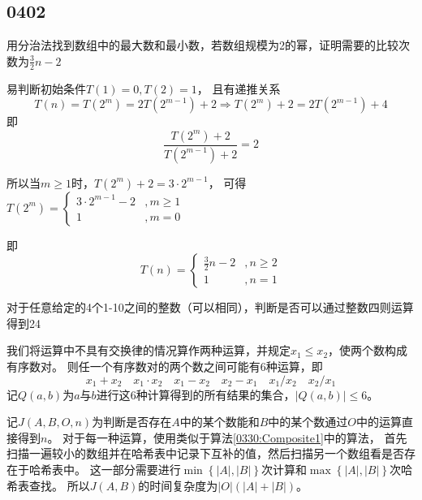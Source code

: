 \begin{questions}
    \section{0402}\label{sec:0402}

    \question 用分治法找到数组中的最大数和最小数，若数组规模为2的幂，证明需要的比较次数为$\frac{3}{2} n -2$
    \begin{solution}
        易判断初始条件$T(1) = 0, T(2) = 1$，
        且有递推关系
        \[ T(n) = T(2^m) = 2T(2^{m-1}) + 2 \Rightarrow T(2^m) + 2 = 2T(2^{m-1}) + 4 \]
        即
        \[ \frac{T(2^m) + 2}{T(2^{m-1}) + 2} = 2 \]

        所以当$m \ge 1$时，$T(2^m) + 2 = 3 \cdot 2^{m-1}$，
        可得$T(2^m) = \begin{cases}
                3 \cdot 2^{m-1} - 2 & , m \ge 1 \\
                1                   & , m = 0
            \end{cases}
        $

        即
        \[
            T(n) = \begin{cases}
                \frac{3}{2} n - 2 & , n \ge 2 \\
                1                 & , n = 1
            \end{cases}
        \]
    \end{solution}

    \question 对于任意给定的4个1-10之间的整数（可以相同），判断是否可以通过整数四则运算得到24
    \begin{solution}
        我们将运算中不具有交换律的情况算作两种运算，并规定$x_1 \leq x_2$，使两个数构成有序数对。
        则任一个有序数对的两个数之间可能有$6$种运算，即 \[
            x_1 + x_2 \quad x_1 \cdot x_2 \quad x_1 - x_2 \quad x_2 - x_1 \quad x_1 / x_2 \quad x_2 / x_1
        \]
        记$Q(a,b)$为$a$与$b$进行这$6$种计算得到的所有结果的集合，$|Q(a,b)| \le 6$。

        记$J(A,B,O,n)$为判断是否存在$A$中的某个数能和$B$中的某个数通过$O$中的运算直接得到$n$。
        对于每一种运算，使用类似于算法\ref{0330:Composite1}中的算法，
        首先扫描一遍较小的数组并在哈希表中记录下互补的值，然后扫描另一个数组看是否存在于哈希表中。
        这一部分需要进行$\min\left\{ |A|, |B| \right\}$次计算和$\max\left\{ |A|, |B| \right\}$次哈希表查找。
        所以$J(A,B)$的时间复杂度为$|O|(|A| + |B|)$。


\end{solution}
\end{questions}
